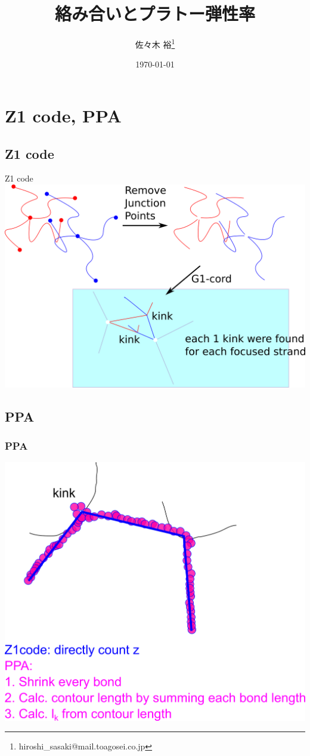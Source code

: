 \documentclass[12pt, dvipdfmx]{beamer}
\title{絡み合いとプラトー弾性率}
\author[東亞合成 佐々木]{佐々木 裕\thanks{hiroshi\_sasaki@mail.toagosei.co.jp}}
\institute[東亞合成]{東亞合成株式会社}
\date{\today}
\begin{document}
\maketitle

\section{Z1 code, PPA}
\subsection{Z1 code}
\begin{frame}{Z1 code}
        \centering
            \includegraphics[width=\textwidth]{z1cord.png}
\end{frame} 

\subsection{PPA}
\begin{frame}
    \frametitle{PPA}
    \centering
            \includegraphics[width=.7\textwidth]{z1_PPA.png}
\end{frame}
\end{document}
